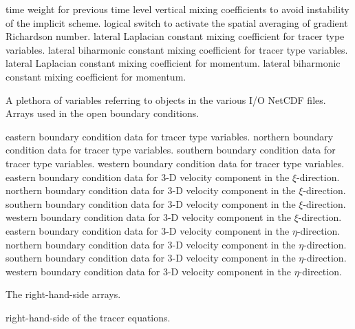 \begin{klist}
\begin{klist}
               time weight for previous time level vertical
    mixing coefficients to avoid instability of the implicit scheme.
           logical switch to activate the spatial
    averaging of gradient Richardson number.
              lateral Laplacian constant mixing coefficient
    for tracer type variables.
              lateral biharmonic constant mixing coefficient
    for tracer type variables.
             lateral Laplacian constant mixing coefficient
    for momentum.
             lateral biharmonic constant mixing coefficient
    for momentum.
    \end{klist}
    A plethora of variables referring to objects in the
  various I/O NetCDF files.
   Arrays used in the open boundary conditions.
    \begin{klist}
             eastern boundary condition data for tracer
   type variables.
             northern boundary condition data for tracer
   type variables.
             southern boundary condition data for tracer
   type variables.
             western boundary condition data for tracer
   type variables.
             eastern boundary condition data for 3-D
   velocity component in the $\xi$-direction.
             northern boundary condition data for 3-D
   velocity component in the $\xi$-direction.
             southern boundary condition data for 3-D
   velocity component in the $\xi$-direction.
             western boundary condition data for 3-D
   velocity component in the $\xi$-direction.
             eastern boundary condition data for 3-D
   velocity component in the $\eta$-direction.
             northern boundary condition data for 3-D
   velocity component in the $\eta$-direction.
             southern boundary condition data for 3-D
   velocity component in the $\eta$-direction.
             western boundary condition data for 3-D
   velocity component in the $\eta$-direction.
    \end{klist}
   The  right-hand-side arrays.
    \begin{klist}
               right-hand-side of the tracer equations.

\end{klist}
\end{klist}
